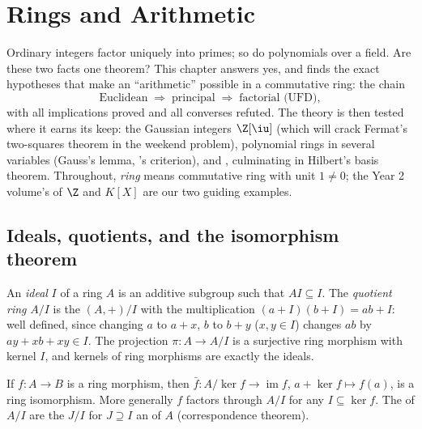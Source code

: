 \chapter{Rings and Arithmetic}\label{ch:b3:rings}

Ordinary integers factor uniquely into primes; so do polynomials
over a field. Are these two facts one theorem? This chapter answers
yes, and finds the exact hypotheses that make an ``arithmetic''
possible in a commutative ring: the chain
\[
\text{Euclidean} \;\Longrightarrow\; \text{principal}
\;\Longrightarrow\; \text{factorial (UFD)},
\]
with all implications proved and all converses refuted. The theory
is then tested where it earns its keep: the Gaussian integers
$\Z[\iu]$ (which will crack Fermat's two-squares theorem in the
weekend problem), polynomial rings in several variables (Gauss's
lemma, 's criterion), and , culminating
in Hilbert's basis theorem. Throughout, \emph{ring} means
commutative ring with unit $1 \neq 0$; the Year 2 volume's 
of $\Z$ and $K[X]$ are our two guiding examples.

\section{Ideals, quotients, and the isomorphism theorem}

\begin{definition}\label{def:b3:rings:ideal}
An \emph{ideal} $I$ of a ring $A$ is an additive
subgroup such that $AI \subseteq I$. The \emph{quotient
ring} $A/I$ is the  $(A, +)/I$
with the multiplication $(a + I)(b + I) = ab + I$: well defined,
since changing $a$ to $a + x$, $b$ to $b + y$ ($x, y \in I$)
changes $ab$ by $ay + xb + xy \in I$. The projection $\pi \colon A
\to A/I$ is a surjective ring morphism with kernel $I$, and kernels
of ring morphisms are exactly the ideals.
\end{definition}

\begin{theorem}\label{thm:b3:rings:firstiso}
If $f \colon A \to B$ is a ring morphism, then $\bar f\colon
A/\ker f \to \operatorname{im} f$, $a + \ker f \mapsto f(a)$, is a
ring isomorphism. More generally $f$ factors through $A/I$ for any
 $I \subseteq \ker f$. The  of $A/I$ are the $J/I$ for
$J \supseteq I$ an  of $A$ (correspondence theorem).
\end{theorem}

